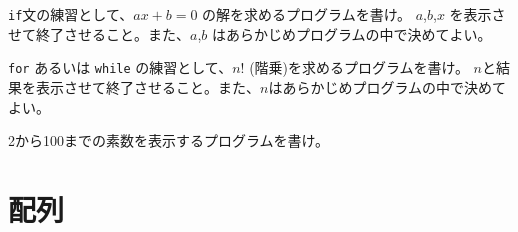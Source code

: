 \begin{renshuu}\label{prob:2-1}
\verb|if|文の練習として、$ax+b=0$ の解を求めるプログラムを書け。
$a$,$b$,$x$ を表示させて終了させること。また、$a$,$b$ はあらかじめプログラムの中で決めてよい。
\end{renshuu}

\begin{renshuu}\label{prob:2-2}
\verb|for| あるいは \verb|while| の練習として、$n!$ (階乗)を求めるプログラムを書け。
$n$と結果を表示させて終了させること。また、$n$はあらかじめプログラムの中で決めてよい。
\end{renshuu}

\begin{renshuu}\label{prob:2-3}
2から100までの素数を表示するプログラムを書け。
\end{renshuu}

\section{配列}
